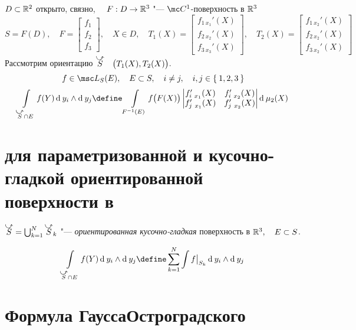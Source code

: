 \begin{definition}
	$ D \subset \mathbb{R}^2 $ открыто, связно, $ \quad F : D \to \mathbb{R}^3 $ "--- $ \mc C^1 $-поверхность в $ \mathbb{R}^3 $ \\
	$ S = F(D), \quad F =
	\begin{bmatrix}
		f_1 \\
		f_2 \\
		f_3
	\end{bmatrix}, \quad X \in D, \quad T_1(X) =
	\begin{bmatrix}
		f_{1~x_1}'(X) \\
		f_{2~x_2}'(X) \\
		f_{3~x_3}'(X)
	\end{bmatrix}, \quad T_2(X) =
	\begin{bmatrix}
		f_{1~x_2}'(X) \\
		f_{2~x_2}'(X) \\
		f_{3~x_2}'(X)
	\end{bmatrix} $ \\
	Рассмотрим ориентацию $ \curvedir S \quad \bigl(T_1(X), T_2(X) \bigr) $.
	$$ f \in \msc L_S(E), \quad E \sub S, \quad i \ne j, \quad i, j \in \set{1, 2, 3} $$
	$$ \int\limits_{\curvedir S \cap E} f(Y) \di y_i \wedge \di y_j \define \int\limits_{F^{-1}(E)} f \bigl(F(X) \bigr)
	\begin{vmatrix}
		f_{i~x_1}'(X) & f_{i~x_2}'(X) \\
		f_{j~x_1}'(X) & f_{j~x_2}'(X)
	\end{vmatrix} \di \mu_2(X) $$
\end{definition}

\section{ для параметризованной и кусочно-гладкой ориентированной поверхности в }

\begin{definition}
	$ \curvedir S = \bigcup_{k = 1}^N \curvedir S_k $ "--- \emph{ориентированная кусочно-гладкая} поверхность в $ \mathbb{R}^3, \quad E \subset S $.
	
	$$ \int\limits_{\curvedir S \cap E} f(Y) \di y_i \wedge \di y_j \define \sum_{k = 1}^N \int f\big|_{S_k}\di y_i \wedge \di y_j $$
\end{definition}

\section{Формула ГауссаОстроградского}


